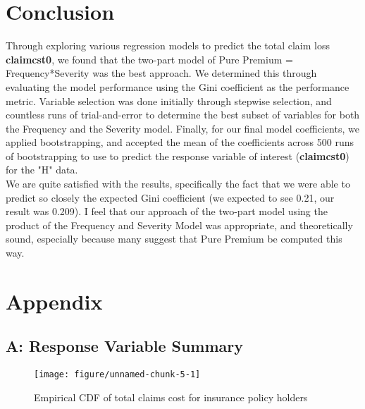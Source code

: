 \documentclass[a4paper]{article}\usepackage[]{graphicx}\usepackage[]{color}
\makeatletter
\def\maxwidth{ %
  \ifdim\Gin@nat@width>\linewidth
    \linewidth
  \else
    \Gin@nat@width
  \fi
}
\newenvironment{knitrout}{}{} %
\makeatother
\begin{document}
\section*{Conclusion}

Through exploring various regression models to predict the total claim loss \textbf{claimcst0}, we found that the two-part model of Pure Premium = Frequency*Severity was the best approach. We determined this through evaluating the model performance using the Gini coefficient as the performance metric. Variable selection was done initially through stepwise selection, and countless runs of trial-and-error to determine the best subset of variables for both the Frequency and the Severity model. Finally, for our final model coefficients, we applied bootstrapping, and accepted the mean of the coefficients across 500 runs of bootstrapping to use to predict the response variable of interest (\textbf{claimcst0}) for the "H" data. 
\\

We are quite satisfied with the results, specifically the fact that we were able to predict so closely the expected Gini coefficient (we expected to see 0.21, our result was 0.209). I feel that our approach of the two-part model using the product of the Frequency and Severity Model was appropriate, and theoretically sound, especially because many suggest that Pure Premium be computed this way.
\\

\newpage
\section*{Appendix}

\subsection*{A: Response Variable Summary}


\begin{figure}[h]
\vspace{-20pt}
\begin{knitrout}
\color{fgcolor}

{\centering \texttt{[image: figure/unnamed-chunk-5-1]} 

}



\end{knitrout}
\vspace{-20pt}
\caption{Empirical CDF of total claims cost for insurance policy holders}
\end{figure}
\end{document}
